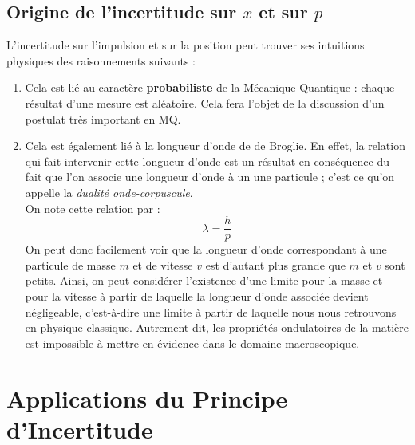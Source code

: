 \documentclass[../Notes de cours]{subfiles}
\begin{document}
\subsection{Origine de l'incertitude sur $x$ et sur $p$}
L'incertitude sur l'impulsion et sur la position peut trouver ses intuitions physiques des raisonnements suivants :
\begin{enumerate}
    \item Cela est lié au caractère \textbf{probabiliste} de la Mécanique Quantique : chaque résultat d'une mesure est aléatoire. Cela fera l'objet de la discussion d'un postulat très important en MQ. 
    \item Cela est également lié à la longueur d'onde de de Broglie. En effet, la relation qui fait intervenir cette longueur d'onde est un résultat en conséquence du fait que l'on associe une longueur d'onde à un une particule ; c'est ce qu'on appelle la \textit{dualité onde-corpuscule}. \\
    On note cette relation par : 
    \begin{equation}
    \label{Broglie}
    \lambda = \frac{h}{p}
    \end{equation}
    On peut donc facilement voir que la longueur d'onde correspondant à une particule de masse $m$ et de vitesse $v$ est d'autant plus grande que $m$ et $v$ sont petits. Ainsi, on peut considérer l'existence d'une limite pour la masse et pour la vitesse à partir de laquelle la longueur d'onde associée devient négligeable, c'est-à-dire une limite à partir de laquelle nous nous retrouvons en physique classique. Autrement dit, les propriétés ondulatoires de la matière est impossible à mettre en évidence dans le domaine macroscopique.  \\
\end{enumerate}



\section{Applications du Principe d'Incertitude}
\end{document}
